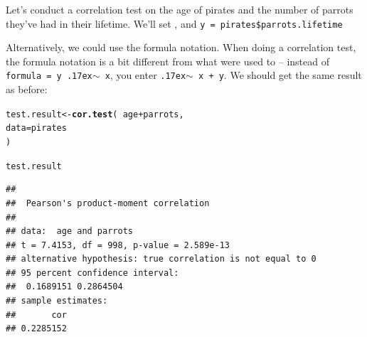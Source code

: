\documentclass{tufte-book}\usepackage[]{graphicx}\usepackage[]{color}
\makeatletter
\newcommand{\hlopt}[1]{\textcolor[rgb]{0,0,0}{#1}}%
\newcommand{\hlstd}[1]{\textcolor[rgb]{0.345,0.345,0.345}{#1}}%
\newcommand{\hlkwb}[1]{\textcolor[rgb]{0.69,0.353,0.396}{#1}}%
\newcommand{\hlkwc}[1]{\textcolor[rgb]{0.333,0.667,0.333}{#1}}%
\newcommand{\hlkwd}[1]{\textcolor[rgb]{0.737,0.353,0.396}{\textbf{#1}}}%
\newenvironment{kframe}{%
 \def\at@end@of@kframe{}%
 \ifinner\ifhmode%
  \def\at@end@of@kframe{\end{minipage}}%
  \begin{minipage}{\columnwidth}%
 \fi\fi%
 \def\FrameCommand##1{\hskip\@totalleftmargin \hskip-\fboxsep
 \colorbox{shadecolor}{##1}\hskip-\fboxsep
     \hskip-\linewidth \hskip-\@totalleftmargin \hskip\columnwidth}%
 \MakeFramed {\advance\hsize-\width
   \@totalleftmargin\z@ \linewidth\hsize
   \@setminipage}}%
 {\par\unskip\endMakeFramed%
 \at@end@of@kframe}
\newenvironment{knitrout}{}{} %
\makeatother
\begin{document}
Let's conduct a correlation test on the age of pirates and the number of parrots they've had in their lifetime. We'll set , and \texttt{y = pirates\$parrots.lifetime}


Alternatively, we could use the formula notation. When doing a correlation test, the formula notation is a bit different from what were used to -- instead of \texttt{formula = y {\raise.17ex\hbox{$\scriptstyle\sim$}} x}, you enter \texttt{{\raise.17ex\hbox{$\scriptstyle\sim$}} x + y}. We should get the same result as before:




\begin{footnotesize}
\begin{knitrout}
\color{fgcolor}\begin{kframe}
\begin{alltt}
\hlstd{test.result} \hlkwb{<-} \hlkwd{cor.test}\hlstd{(}\hlopt{~} \hlstd{age} \hlopt{+} \hlstd{parrots,}
                        \hlkwc{data} \hlstd{= pirates}
                        \hlstd{)}

\hlstd{test.result}
\end{alltt}
\begin{verbatim}
## 
## 	Pearson's product-moment correlation
## 
## data:  age and parrots
## t = 7.4153, df = 998, p-value = 2.589e-13
## alternative hypothesis: true correlation is not equal to 0
## 95 percent confidence interval:
##  0.1689151 0.2864504
## sample estimates:
##       cor 
## 0.2285152
\end{verbatim}
\end{kframe}
\end{knitrout}
\end{footnotesize}
\end{document}
